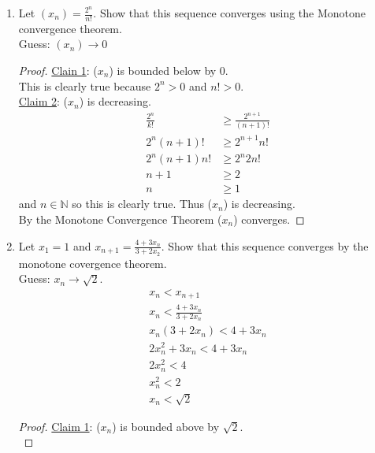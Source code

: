 \documentclass[12pt]{article}
\begin{document}
\begin{enumerate}
\begin{proof}
\begin{align*}
			      \Rightarrow a_n           & \leq 1+\frac{a_n}{2} \\
			      \Rightarrow a_n           & \leq a_{n+1}
		      \end{align*}
		      Thus ($a_n$) is decreasing, and by the Monotone Convergence Theorem it converges.
	      \end{proof}
	\item Let $(x_n) = \frac{2^n}{n!}$. Show that this sequence converges using the Monotone convergence
	      theorem. \\
	      Guess: $(x_n) \rightarrow 0$
	      \begin{proof}
		      \underline{Clain 1}: ($x_n$) is bounded below by 0. \\
		      This is clearly true because $2^n > 0$ and $n! > 0$. \\
		      \underline{Claim 2}: ($x_n$) is decreasing.
		      \begin{align*}
			      \frac{2^n}{k!} & \geq \frac{2^{n+1}}{(n+1)!} \\
			      2^n(n+1)!      & \geq 2^{n+1}n!              \\
			      2^n(n+1)n!     & \geq 2^n2n!                 \\
			      n+1            & \geq 2                      \\
			      n              & \geq 1
		      \end{align*}
		      and $n \in \mathbb{N}$ so this is clearly true. Thus ($x_n$) is decreasing. \\
		      By the Monotone Convergence Theorem ($x_n$) converges.
	      \end{proof}
	\item Let $x_1 = 1$ and $x_{n+1} = \frac{4+3x_n}{3+2x_2}$. Show that this sequence converges by the monotone
	      covergence theorem. \\
	      Guess: $x_n \rightarrow \sqrt{2}$.
	      \begin{gather*}
		      x_n < x_{n+1} \\
		      x_n < \frac{4+3x_n}{3+2x_n} \\
		      x_n(3+2x_n) < 4+3x_n \\
		      2x_n^2+3x_n < 4+3x_n \\
		      2x_n^2 < 4 \\
		      x_n^2 < 2 \\
		      x_n < \sqrt{2}
	      \end{gather*}
	      \begin{proof}
		      \underline{Claim 1}: ($x_n$) is bounded above by $\sqrt{2}$. \\

\end{proof}
\end{enumerate}
\end{document}
